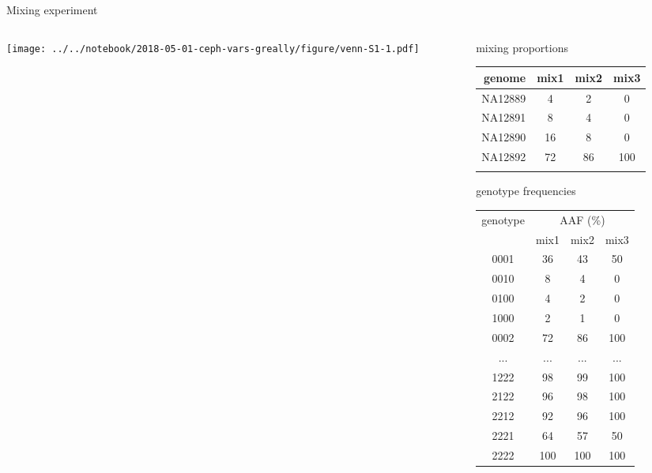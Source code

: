 \documentclass{beamer}
\begin{document}
\begin{frame}{Mixing experiment}
\begin{columns}[t]
\begin{column}{0.5\textwidth}

\texttt{[image: ../../notebook/2018-05-01-ceph-vars-greally/figure/venn-S1-1.pdf]}
\end{column}

\begin{column}{0.5\textwidth}

{\tiny
{\large mixing proportions}

\begin{tabular}{r|ccc}
genome & mix1 & mix2 & mix3 \\
\hline
NA12889 & 4 & 2 & 0 \\
NA12891 & 8 & 4 & 0 \\
NA12890 & 16 & 8 & 0 \\
NA12892 & 72 & 86 & 100 \\
& & & \\
\end{tabular}
\vfill
{\large genotype frequencies}

\begin{tabular}{c|ccc}
genotype & \multicolumn{3}{c}{AAF (\%)} \\
& mix1 &  mix2 & mix3 \\
\hline
0001 & 36 & 43 & 50\\
0010 & 8 & 4 & 0\\
0100 & 4 & 2 & 0\\
1000 & 2 & 1 & 0\\
0002 & 72 & 86 & 100\\
... & ... & ... & ...\\
1222 & 98 & 99 & 100\\
2122 & 96 & 98 & 100\\
2212 & 92 & 96 & 100\\
2221 & 64 & 57 & 50\\
2222 & 100 & 100 & 100\\
\end{tabular}
}
\end{column}
\end{columns}
\end{frame}
\end{document}
